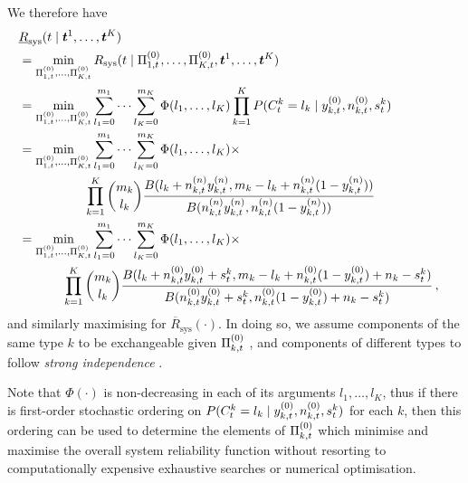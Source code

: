 \documentclass[12pt, a4paper]{elsarticle}
\newcommand{\bs}[1]{\boldsymbol{#1}}
\renewcommand{\vec}[1]{{\bs#1}}
\newcommand{\ul}[1]{\underline{#1}}
\newcommand{\ol}[1]{\overline{#1}}
\newcommand{\Rsys}{R_\text{sys}}
\newcommand{\lRsys}{\ul{R}_\text{sys}}
\newcommand{\uRsys}{\ol{R}_\text{sys}}
\begin{document}
We therefore have
%
\begin{align}
\lefteqn{\lRsys(t \mid \vec{t}^1, \ldots, \vec{t}^K)} \nonumber \\
 &= \min_{\PtZi{1}, \ldots, \PtZi{K}} \Rsys(t \mid \PtZi{1}, \ldots, \PtZi{K}, \vec{t}^1, \ldots, \vec{t}^K) \nonumber \\
 &= \min_{\PtZi{1}, \ldots, \PtZi{K}} 
    \sum_{l_1=0}^{m_1} \cdots \sum_{l_K=0}^{m_K} \Phi(l_1, \ldots, l_K)
                                                 \prod_{k=1}^K P(C^k_t = l_k \mid \yktz, \nktz, s^k_t) \nonumber \\
 &= \min_{\PtZi{1}, \ldots, \PtZi{K}} 
    \sum_{l_1=0}^{m_1} \cdots \sum_{l_K=0}^{m_K} \Phi(l_1, \ldots, l_K) \times \nonumber \\ & \hspace*{12ex}
    \prod_{k=1}^K {m_k \choose l_k} \frac{B(l_k + \nn_{k,t}\yn_{k,t}, m_k - l_k + \nn_{k,t}(1-\yn_{k,t}))}
                                         {B(\nn_{k,t}\yn_{k,t}, \nn_{k,t}(1-\yn_{k,t}))} \nonumber \\
 &= \min_{\PtZi{1}, \ldots, \PtZi{K}} 
    \sum_{l_1=0}^{m_1} \cdots \sum_{l_K=0}^{m_K} \Phi(l_1, \ldots, l_K) \times \nonumber \\ & \hspace*{8ex}
    \prod_{k=1}^K {m_k \choose l_k} \frac{B(l_k + \nktz\yktz + s^k_t, m_k - l_k + \nktz(1-\yktz) + n_k - s^k_t)}{B(\nktz\yktz + s^k_t, \nktz(1-\yktz) + n_k - s^k_t)}
    \,, \label{eq:LwrSysPostA}
\end{align}
and similarly maximising for $\uRsys(\cdot)$.
In doing so, we assume components of the same type $k$ to be exchangeable given $\Pi^{(0)}_{k,t}$
\citep[see][\S 3.4 on extending exchangeability to imprecise probability]{itip},
and components of different types to follow \emph{strong independence}
\citep[see][\S 3.2.4]{itip}.

Note that $\Phi(\cdot)$ is non-decreasing in each of its arguments $l_1,\ldots,l_K$,
thus if there is first-order stochastic ordering on $P(C^k_t = l_k \mid y^{(0)}_{k,t}, n^{(0)}_{k,t}, s^k_t)$
for each $k$, then this ordering can be used to determine the elements of $\Pi^{(0)}_{k,t}$
which minimise and maximise the overall system reliability function without
resorting to computationally expensive exhaustive searches or numerical optimisation.
\end{document}
